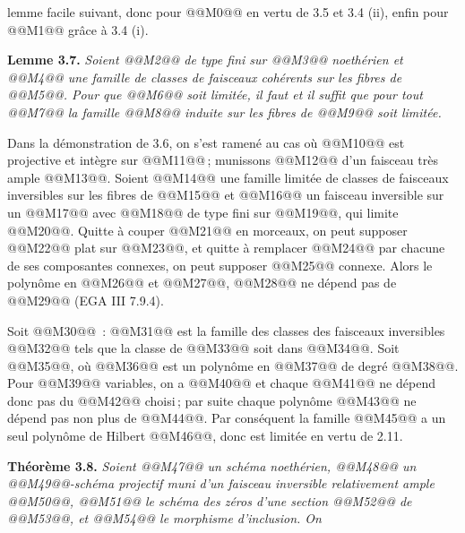 
lemme facile suivant, donc pour @@M0@@ en vertu de 3.5 et 3.4 (ii), enfin pour @@M1@@ gr\^ace \`a 3.4 (i).

\textbf{Lemme 3.7.} \emph{Soient @@M2@@ de type fini sur @@M3@@ noeth\'erien et @@M4@@ une famille de classes de faisceaux coh\'erents sur les fibres de @@M5@@. Pour que @@M6@@ soit limit\'ee, il faut et il suffit que pour tout @@M7@@ la famille @@M8@@ induite sur les fibres de @@M9@@ soit limit\'ee.}

Dans la d\'emonstration de 3.6, on s'est ramen\'e au cas o\`u @@M10@@ est projective et int\`egre sur @@M11@@\,; munissons @@M12@@ d'un faisceau tr\`es ample @@M13@@. Soient @@M14@@ une famille limit\'ee de classes de faisceaux inversibles sur les fibres de @@M15@@ et @@M16@@ un faisceau inversible sur un @@M17@@ avec @@M18@@ de type fini sur @@M19@@, qui limite @@M20@@. Quitte \`a couper @@M21@@ en morceaux, on peut supposer @@M22@@ plat sur @@M23@@, et quitte \`a remplacer @@M24@@ par chacune de ses composantes connexes, on peut supposer @@M25@@ connexe. Alors le polyn\^ome en @@M26@@ et @@M27@@, @@M28@@ ne d\'epend pas de @@M29@@ (EGA III 7.9.4).

Soit @@M30@@~: @@M31@@ est la famille des classes des faisceaux inversibles @@M32@@ tels que la classe de @@M33@@ soit dans @@M34@@. Soit @@M35@@, o\`u @@M36@@ est un polyn\^ome en @@M37@@ de degr\'e @@M38@@. Pour @@M39@@ variables, on a @@M40@@ et chaque @@M41@@ ne d\'epend donc pas du @@M42@@ choisi\,; par suite chaque polyn\^ome @@M43@@ ne d\'epend pas non plus de @@M44@@. Par cons\'equent la famille @@M45@@ a un seul polyn\^ome de Hilbert @@M46@@, donc est limit\'ee en vertu de 2.11.

\textbf{Th\'eor\`eme 3.8.} \emph{Soient @@M47@@ un sch\'ema noeth\'erien, @@M48@@ un @@M49@@-sch\'ema projectif muni d'un faisceau inversible relativement ample @@M50@@, @@M51@@ le sch\'ema des z\'eros d'une section @@M52@@ de @@M53@@, et @@M54@@ le morphisme d'inclusion. On}
